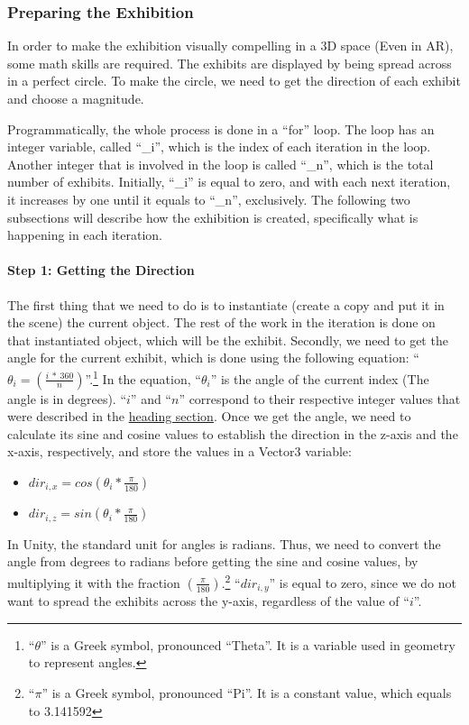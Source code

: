 \subsubsection*{Preparing the Exhibition}
\label{PreparingtheExhibitionSec}
In order to make the exhibition visually compelling in a 3D space (Even in \acrshort{AR}), some math skills are required. The exhibits are displayed by being spread across in a perfect circle. To make the circle, we need to get the direction of each exhibit and choose a magnitude. 

Programmatically, the whole process is done in a “{\codefont for}” loop. The loop has an integer variable, called “{\codefont \_i}”, which is the index of each iteration in the loop. Another integer that is involved in the loop is called “{\codefont \_n}”, which is the total number of exhibits. Initially, “{\codefont \_i}” is equal to zero, and with each next iteration, it increases by one until it equals to “{\codefont \_n}”, exclusively. The following two subsections will describe how the exhibition is created, specifically what is happening in each iteration.

\paragraph{Step 1: Getting the Direction}
The first thing that we need to do is to instantiate (create a copy and put it in the scene) the current object. The rest of the work in the iteration is done on that instantiated object, which will be the exhibit. Secondly, we need to get the angle for the current exhibit, which is done using the following equation: “$\theta_i = \left(\frac{i \ * \ 360}{n}\right)$”.\footnote{“$\theta$” is a Greek symbol, pronounced “Theta”. It is a variable used in geometry to represent angles.}  In the equation, “$\theta_i$” is the angle of the current index (The angle is in degrees). “$i$” and “$n$” correspond to their respective integer values that were described in the \hyperref[PreparingtheExhibitionSec]{heading section}. Once we get the angle, we need to calculate its sine and cosine values to establish the direction in the z-axis and the x-axis, respectively, and store the values in a {\codefont Vector3} variable:
\begin{itemize}
    \item {$dir_{i, x} = cos\left(\theta_i * \frac{\pi}{180}\right)$}
    \item {$dir_{i, z} = sin\left(\theta_i * \frac{\pi}{180}\right)$}
 \end{itemize}
In Unity, the standard unit for angles is radians. Thus, we need to convert the angle from degrees to radians before getting the sine and cosine values, by multiplying it with the fraction $\left(\frac{\pi}{180}\right)$.\footnote{“$\pi$” is a Greek symbol, pronounced “Pi”. It is a constant value, which equals to 3.141592}  “$dir_{i, y}$” is equal to zero, since we do not want to spread the exhibits across the y-axis, regardless of the value of “$i$”.


